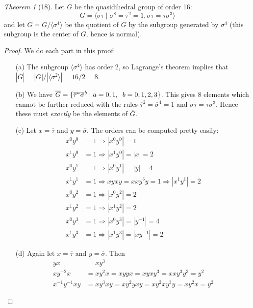 \documentclass[12pt]{article}
\theoremstyle{remark}
\theoremstyle{named}
\newtheorem*{theorem}{Theorem}
\renewcommand{\implies}{\Rightarrow}
\begin{document}
\begin{theorem}[18]
    Let \(G\) be the quasidihedral group of order 16:
    \[G = \langle \sigma \tau \mid \sigma^8 = \tau^2 = 1, \sigma \tau = \tau \sigma^3\rangle\]
    and let \(\overline{G} = G / \langle \sigma^4 \rangle\) be the quotient of \(G\) by the subgroup generated by \(\sigma^4\) (this subgroup is the center of \(G\), hence is normal).
\end{theorem}

\begin{proof}
    We do each part in this proof:
    \begin{enumerate}
        \item[(a)] The subgroup \(\langle \sigma^4 \rangle\) has order 2, so Lagrange's theorem implies that \(|\overline{G}| = |G| / |\langle \sigma^2 \rangle| = 16 / 2 = 8\).
 
        \item[(b)] We have \(\overline{G} = \{\overline{\tau}^a\overline{\sigma}^b \mid a = 0, 1, \hspace{2mm} b = 0, 1, 2, 3\}\). This gives 8 elements which cannot be further reduced with the rules \(\overline{\tau}^2 = \overline{\sigma}^4 = 1\) and \(\sigma \tau = \tau \sigma^3\). Hence these must \textit{exactly} be the elements of \(\overline{G}\).
 
        \item[(c)] Let \(x = \overline{\tau}\) and \(y = \overline{\sigma}\). The orders can be computed pretty easily:
        \begin{align*}
            x^0 y^0 &= 1 \implies |x^0y^0| = 1 \\
            x^1 y^0 &= 1 \implies |x^1y^0| = |x| = 2 \\
            x^0 y^1 &= 1 \implies |x^0y^1| = |y| = 4 \\
            x^1 y^1 &= 1 \implies xyxy = xxy^3y = 1 \implies |x^1y^1| = 2 \\
            x^0 y^2 &= 1 \implies |x^0y^2| = 2 \\
            x^1 y^2 &= 1 \implies |x^1y^2| = 2 \\
            x^0 y^3 &= 1 \implies |x^0y^3| = |y^{-1}| = 4 \\
            x^1 y^3 &= 1 \implies |x^1y^3| = |xy^{-1}| = 2
        \end{align*}

        \item[(d)] Again let \(x = \overline{\tau}\) and \(y = \overline{\sigma}\). Then 
        \begin{align*}
            yx &= xy^3 \\
            xy^{-2}x &= xy^2x = xyyx = xyxy^3 = xxy^3y^3 = y^2 \\
            x^{-1}y^{-1}xy &= xy^3xy = xy^2 yxy = xy^2 xy^3 y = xy^2x = y^2
        \end{align*}
        

\end{enumerate}
\end{proof}
\end{document}
